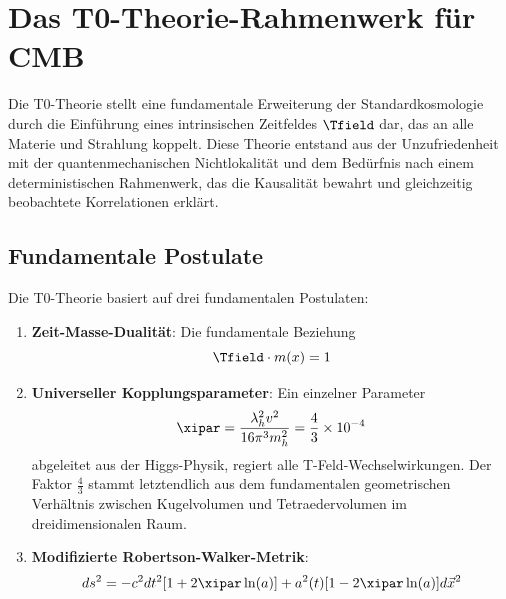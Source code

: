 	
	\section{Das T0-Theorie-Rahmenwerk für CMB}
	\label{sec:t0_framework}
	
	Die T0-Theorie stellt eine fundamentale Erweiterung der Standardkosmologie durch die Einführung eines intrinsischen Zeitfeldes $\Tfield$ dar, das an alle Materie und Strahlung koppelt. Diese Theorie entstand aus der Unzufriedenheit mit der quantenmechanischen Nichtlokalität und dem Bedürfnis nach einem deterministischen Rahmenwerk, das die Kausalität bewahrt und gleichzeitig beobachtete Korrelationen erklärt.
	
	\subsection{Fundamentale Postulate}
	
	Die T0-Theorie basiert auf drei fundamentalen Postulaten:
	
	\begin{enumerate}
		\item \textbf{Zeit-Masse-Dualität}: Die fundamentale Beziehung
		\begin{equation}
			\Tfield \cdot m(x) = 1
			\label{eq:time_mass_duality}
		\end{equation}
		
		\item \textbf{Universeller Kopplungsparameter}: Ein einzelner Parameter
		\begin{equation}
			\xipar = \frac{\lambda_h^2 v^2}{16\pi^3 m_h^2} = \frac{4}{3} \times 10^{-4}
			\label{eq:xi_definition}
		\end{equation}
		abgeleitet aus der Higgs-Physik, regiert alle T-Feld-Wechselwirkungen. Der Faktor $\frac{4}{3}$ stammt letztendlich aus dem fundamentalen geometrischen Verhältnis zwischen Kugelvolumen und Tetraedervolumen im dreidimensionalen Raum.
		
		\item \textbf{Modifizierte Robertson-Walker-Metrik}:
		\begin{equation}
			ds^2 = -c^2dt^2[1 + 2\xipar\ln(a)] + a^2(t)[1 - 2\xipar\ln(a)]d\vec{x}^2
			\label{eq:modified_metric}
		\end{equation}
	\end{enumerate}
	
